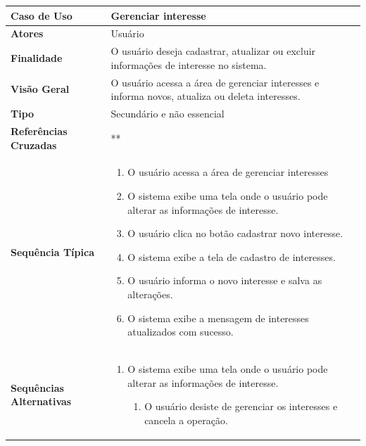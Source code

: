 \documentclass[a4paper,11pt]{article}
\begin{document}
\begin{table}[H]
		\begin{tabularx}{\textwidth}{|l|X|}
		\hline
			\textbf{Caso de Uso} &  Gerenciar interesse \\ \hline
			\textbf{Atores} & Usuário   \\ \hline
			\textbf{Finalidade} & O usuário deseja cadastrar, atualizar ou excluir informações de interesse no sistema.  \\ \hline
			\textbf{Visão Geral} &  O usuário acessa a área de gerenciar interesses e informa novos, atualiza ou deleta interesses. \\ \hline
			\textbf{Tipo} & Secundário e não essencial \\ \hline
			\textbf{Referências Cruzadas} & ** \\ \hline
			\textbf{Sequência Típica} & 
			\begin{enumerate}
			\item O usuário acessa a área de gerenciar interesses
			\item O sistema exibe uma tela onde o usuário pode alterar as informações de interesse.	
			\item O usuário clica no botão cadastrar novo interesse.
			\item O sistema exibe a tela de cadastro de interesses.
			\item O usuário informa o novo interesse e salva as alterações.
			\item O sistema exibe a mensagem de interesses atualizados com sucesso.
			\end{enumerate} \\ \hline
			\textbf{Sequências Alternativas} & 
			\begin{enumerate}
			\item O sistema exibe uma tela onde o usuário pode alterar as informações de interesse.
			\begin{enumerate}
			\item O usuário desiste de gerenciar os interesses e cancela a operação.
			\end{enumerate}
			\end{enumerate} \\ \hline
		\end{tabularx}
\end{table}
\end{document}
